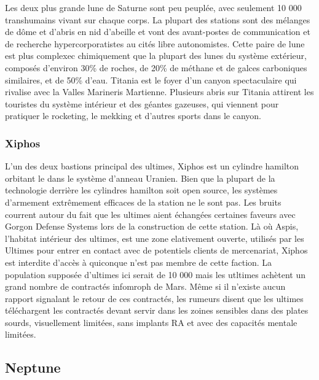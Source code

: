                                                                      Les deux plus grande lune de Saturne sont peu peuplée, avec seulement 10 000 transhumains vivant sur chaque corps. La plupart des stations sont des mélanges de dôme et d'abris en nid d'abeille et vont des avant-postes de communication et de recherche hypercorporatistes au cités libre autonomistes. Cette paire de lune est plus complexec chimiquement que la plupart des lunes du système extérieur, composés d'environ 30\% de roches, de 20\% de méthane et de galces carboniques similaires, et de 50\% d'eau. Titania est le foyer d'un canyon spectaculaire qui rivalise avec la Valles Marineris Martienne. Plusieurs abris sur Titania attirent les touristes du système intérieur et des géantes gazeuses, qui viennent pour pratiquer le rocketing, le mekking et d'autres sports dans le canyon. 

                                                                     \subsubsection{Xiphos} \label{sec:xiphos} 

                                                                     L'un des deux bastions principal des ultimes, Xiphos est un cylindre hamilton orbitant le dans le système d'anneau Uranien. Bien que la plupart de la technologie derrière les cylindres hamilton soit open source, les systèmes d'armement extrêmement efficaces de la station ne le sont pas. Les bruits courrent autour du fait que les ultimes aient échangées certaines faveurs avec Gorgon Defense Systems lors de la construction de cette station. Là où Aspis, l'habitat intérieur des ultimes, est une zone elativement ouverte, utilisés par les Ultimes pour entrer en contact avec de potentiels clients de mercenariat, Xiphos est interdite d'accès à quiconque n'est pas membre de cette faction. La population supposée d'ultimes ici serait de 10 000 mais les utltimes achètent un grand nombre de contractés infomroph de Mars. Même si il n'existe aucun rapport signalant le retour de ces contractés, les rumeurs disent que les ultimes téléchargent les contractés devant servir dans les zoines sensibles dans des plates sourds, visuellement limitées, sans implants RA et avec des capacités mentale limitées. 

                                                                     \subsection{Neptune} \label{sec:neptune} 

